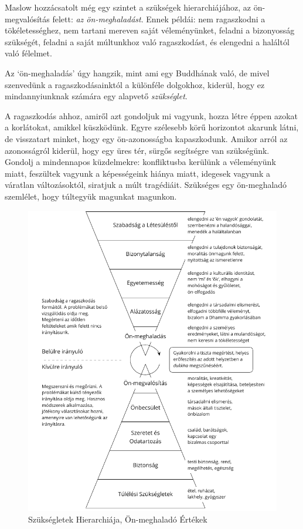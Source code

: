 Maslow hozzácsatolt még egy szintet a szükségek hierarchiájához, az
ön-megvalósítás felett: \emph{az ön-meghaladást}. Ennek példái: nem
ragaszkodni a tökéletességhez, nem tartani mereven saját véleményünket,
feladni a bizonyosság szükségét, feladni a saját múltunkhoz való
ragaszkodást, és elengedni a haláltól való félelmet.

Az `ön-meghaladás' úgy hangzik, mint ami egy Buddhának való, de mivel
szenvedünk a ragaszkodásainktól a különféle dolgokhoz, kiderül, hogy ez
mindannyiunknak számára egy alapvető \emph{szükséglet}.

\enlargethispage*{\baselineskip}

A ragaszkodás ahhoz, amiről azt gondoljuk mi vagyunk, hozza létre éppen
azokat a korlátokat, amikkel küszködünk. Egyre szélesebb körű horizontot
akarunk látni, de visszatart minket, hogy egy ön-azonosságba
kapaszkodunk. Amikor arról az azonosságról kiderül, hogy egy üres tér,
sürgős segítségre van szükségünk. Gondolj a mindennapos küzdelmekre:
konfliktusba kerülünk a véleményünk miatt, feszültek vagyunk a
képességeink hiánya miatt, idegesek vagyunk a váratlan változásoktól,
siratjuk a múlt tragédiáit. Szükséges egy ön-meghaladó szemlélet, hogy
túltegyük magunkat magunkon.

\clearpage
\figurepagelayout

\begin{figure}[h]
\caption{Szükségletek Hierarchiája, Ön-meghaladó Értékek}\label{fig-self-transcendental}
\bigskip
\includegraphics[width=\linewidth]{./manuscript/tex/diagrams/self-transcendental-values-hu.pdf}
\end{figure}


